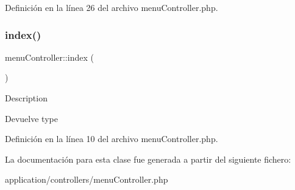 Definición en la línea 26 del archivo menu\+Controller.\+php.

\mbox{\label{classmenu_controller_a2b51402e97607111f6674ca41be2e77a}} 
\subsubsection{\texorpdfstring{index()}{index()}}
{\footnotesize\ttfamily menu\+Controller\+::index (\begin{DoxyParamCaption}{ }\end{DoxyParamCaption})}

Description \begin{DoxyReturn}{Devuelve}
type 
\end{DoxyReturn}


Definición en la línea 10 del archivo menu\+Controller.\+php.



La documentación para esta clase fue generada a partir del siguiente fichero\+:\begin{DoxyCompactItemize}
\item 
application/controllers/menu\+Controller.\+php\end{DoxyCompactItemize}
